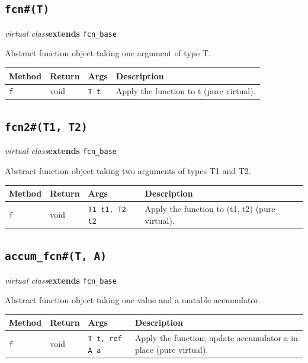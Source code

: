\documentclass[11pt,letterpaper]{report}
\begin{document}
\subsection*{\texttt{fcn\#(T)}}
\noindent\small\textit{virtual class}\quad \textbf{extends} \texttt{fcn\_base}\par

Abstract function object taking one argument of type T.

\begin{xltabular}{\linewidth}{>{\small}p{1.35in} >{\small}p{1.25in} >{\small}p{0.95in} >{\small}X}
\toprule
\textbf{Method} & \textbf{Return} & \textbf{Args} & \textbf{Description} \\
\midrule
\endhead
\bottomrule
\endfoot
\texttt{f} & void & \texttt{T t} & Apply the function to t (pure virtual). \\
\end{xltabular}

\subsection*{\texttt{fcn2\#(T1, T2)}}
\noindent\small\textit{virtual class}\quad \textbf{extends} \texttt{fcn\_base}\par

Abstract function object taking two arguments of types T1 and T2.

\begin{xltabular}{\linewidth}{>{\small}p{1.35in} >{\small}p{1.25in} >{\small}p{0.95in} >{\small}X}
\toprule
\textbf{Method} & \textbf{Return} & \textbf{Args} & \textbf{Description} \\
\midrule
\endhead
\bottomrule
\endfoot
\texttt{f} & void & \texttt{T1 t1, T2 t2} & Apply the function to (t1, t2) (pure virtual). \\
\end{xltabular}

\subsection*{\texttt{accum\_fcn\#(T, A)}}
\noindent\small\textit{virtual class}\quad \textbf{extends} \texttt{fcn\_base}\par

Abstract function object taking one value and a mutable accumulator.

\begin{xltabular}{\linewidth}{>{\small}p{1.35in} >{\small}p{1.25in} >{\small}p{0.95in} >{\small}X}
\toprule
\textbf{Method} & \textbf{Return} & \textbf{Args} & \textbf{Description} \\
\midrule
\endhead
\bottomrule
\endfoot
\texttt{f} & void & \texttt{T t, ref A a} & Apply the function; update accumulator a in place (pure virtual). \\
\end{xltabular}
\end{document}
